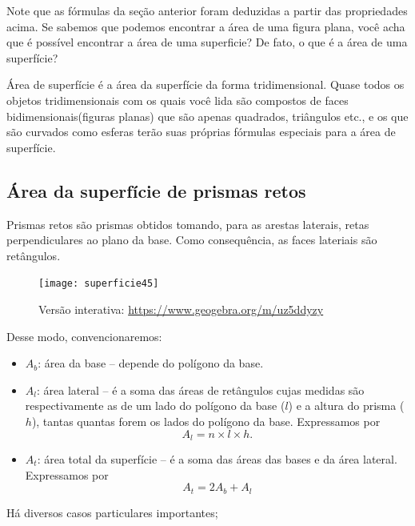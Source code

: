 Note que as fórmulas da seção anterior foram deduzidas a partir das propriedades acima. Se sabemos que podemos encontrar a área de uma figura plana, você acha que é possível encontrar a área de uma superficie? De fato, o que é a área de uma superfície?

Área de superfície é a área da superfície da forma tridimensional. Quase todos os objetos tridimensionais com os quais você lida são compostos de faces bidimensionais(figuras planas) que são apenas quadrados, triângulos etc., e os que são curvados como esferas terão suas próprias fórmulas especiais para a área de superfície.

\subsection{Área da superfície de prismas retos}

Prismas retos são prismas obtidos tomando, para as arestas laterais, retas perpendiculares ao plano da base. Como consequência, as faces lateriais são retângulos.
\begin{figure}[H]
\centering

\texttt{[image: superficie45]}

\caption{Versão interativa: \url{https://www.geogebra.org/m/uz5ddyzy}}
\end{figure}

Desse modo, convencionaremos:
\begin{itemize}
  \item $A_b$: área da base -- depende do polígono da base.
  \item $A_l$: área lateral -- é a soma das áreas de retângulos cujas medidas são respectivamente as de um lado do polígono da base  ($l$) e a altura do prisma ($h$), tantas quantas forem os lados do polígono da base. Expressamos por 
  \begin{equation*}
  A_l=n\times l\times h.
  \end{equation*}
  \item $A_t$: área total da superfície -- é a soma das áreas das bases e da área lateral. Expressamos por 
  \begin{equation*}
  A_t=2A_b+A_l
  \end{equation*}
\end{itemize}

Há diversos casos particulares importantes;

